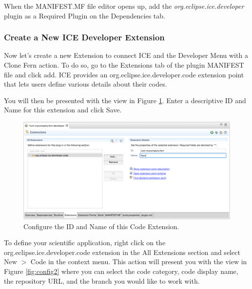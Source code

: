 When the MANIFEST.MF file editor opens up, add the
\emph{org.eclipse.ice.developer} plugin as a Required Plugin on the Dependencies
tab.

\subsubsection*{Create a New ICE Developer Extension}
Now let's create a new Extension to connect ICE and the Developer Menu
with a Clone Fern action. To do so, go to the Extensions tab of the
plugin MANIFEST file and click add. ICE provides an
org.eclipse.ice.developer.code extension point that lets users define various
details about their codes. 

You will then be presented with the view in Figure \ref{fig:config1}. Enter a
descriptive ID and Name for this extension and click Save. 
\begin{figure}[h]
\includegraphics[width=\textwidth]{figures/extptconfig1.png}
\caption{Configure the ID and Name of this Code Extension.}
\label{fig:config1}
\end{figure}

To define your scientific application, right click on the
org.eclipse.ice.developer.code extension in the All Extensions section and
select New $>$ Code in the context menu. This action will present you with the
view in Figure \ref{fig:config2} where you can select the code category, code
display name, the repository URL, and the branch you would like to work with. 

